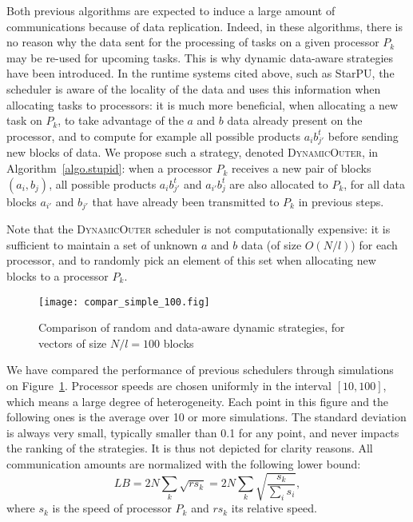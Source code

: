 \documentclass[a4paper,10pt]{article}
\newcommand{\stupid}{\textsc{Dynamic\-Outer}\xspace}
\begin{document}
Both previous algorithms are expected to induce a large amount of
communications because of data replication. Indeed, in these
algorithms, there is no reason why the data sent for the processing of
tasks on a given processor $P_k$ may be re-used for upcoming
tasks. This is why dynamic data-aware strategies have been
introduced. In the runtime systems cited above, such as StarPU, the
scheduler is aware of the locality of the data and uses this
information when allocating tasks to processors: it is much more
beneficial, when allocating a new task on $P_k$, to take advantage of
the $a$ and $b$ data already present on the processor, and to compute
for example all possible products $a_i b_{j'}^t$ before sending new
blocks of data. We propose such a strategy, denoted \stupid, in
Algorithm~\ref{algo.stupid}: when a processor $P_k$ receives a new
pair of blocks $(a_i, b_j)$, all possible products $a_i b_{j'}^t$ and
$a_{i'} b_j^t$ are also allocated to $P_k$, for all data blocks
$a_{i'}$ and $b_{j'}$ that have already been transmitted to $P_k$ in
previous steps.



\begin{algorithm}[htbp]
  \DontPrintSemicolon
  \caption{\stupid strategy.}
  \label{algo.stupid}
\end{algorithm}

Note that the \stupid scheduler is not computationally expensive: it
is sufficient to maintain a set of unknown $a$ and $b$ data (of size
$O(N/l)$) for each processor, and to randomly pick an element of this
set when allocating new blocks to a processor $P_k$. 

\begin{figure}[htbp]
  \centering
  \texttt{[image: compar\_simple\_100.fig]}
  \caption{Comparison of random and data-aware dynamic strategies, for
    vectors of size $N/l=100$ blocks}
  \label{fig.rand_vs_data_aware}
\end{figure}

We have compared the performance of previous schedulers through
simulations on Figure~\ref{fig.rand_vs_data_aware}. Processor speeds
are chosen uniformly in the interval $[10, 100]$, which means a large
degree of heterogeneity. Each point in this figure and the following
ones is the average over 10 or more simulations. The standard
deviation is always very small, typically smaller than 0.1 for any
point, and never impacts the ranking of the strategies. It is thus not
depicted for clarity reasons. All communication amounts are normalized
with the following lower bound:
$$
LB=2 N \sum_k\sqrt{\mathit{rs}_k} = 2 N \sum_k\sqrt{\frac{s_k}{\sum_i s_i}},
$$ 
where $s_k$ is the speed of processor $P_k$ and $\mathit{rs}_k$ its
relative speed.
\end{document}
